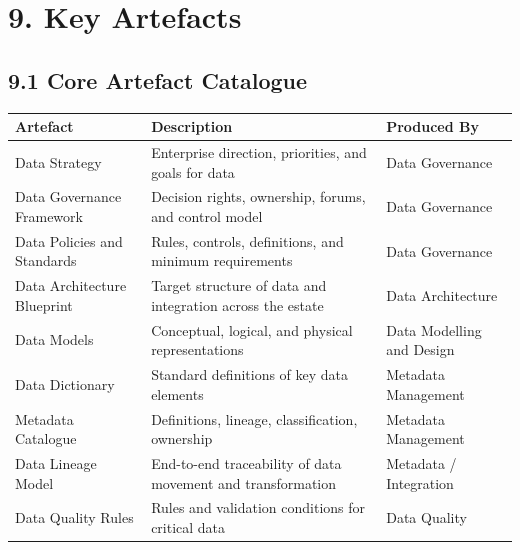 \documentclass[
  letterpaper,
  DIV=11,
  numbers=noendperiod]{scrartcl}
\begin{document}
\section{9. Key Artefacts}\label{key-artefacts}

\subsection{9.1 Core Artefact Catalogue}\label{core-artefact-catalogue}

\begin{longtable}[]{@{}
  >{\raggedright\arraybackslash}p{}
  >{\raggedright\arraybackslash}p{}
  >{\raggedright\arraybackslash}p{}@{}}
\toprule\noalign{}
\begin{minipage}[b]{\linewidth}\raggedright
Artefact
\end{minipage} & \begin{minipage}[b]{\linewidth}\raggedright
Description
\end{minipage} & \begin{minipage}[b]{\linewidth}\raggedright
Produced By
\end{minipage} \\
\midrule\noalign{}
\endhead
\bottomrule\noalign{}
\endlastfoot
Data Strategy & Enterprise direction, priorities, and goals for data &
Data Governance \\
Data Governance Framework & Decision rights, ownership, forums, and
control model & Data Governance \\
Data Policies and Standards & Rules, controls, definitions, and minimum
requirements & Data Governance \\
Data Architecture Blueprint & Target structure of data and integration
across the estate & Data Architecture \\
Data Models & Conceptual, logical, and physical representations & Data
Modelling and Design \\
Data Dictionary & Standard definitions of key data elements & Metadata
Management \\
Metadata Catalogue & Definitions, lineage, classification, ownership &
Metadata Management \\
Data Lineage Model & End-to-end traceability of data movement and
transformation & Metadata / Integration \\
Data Quality Rules & Rules and validation conditions for critical data &
Data Quality \\

\end{longtable}
\end{document}
